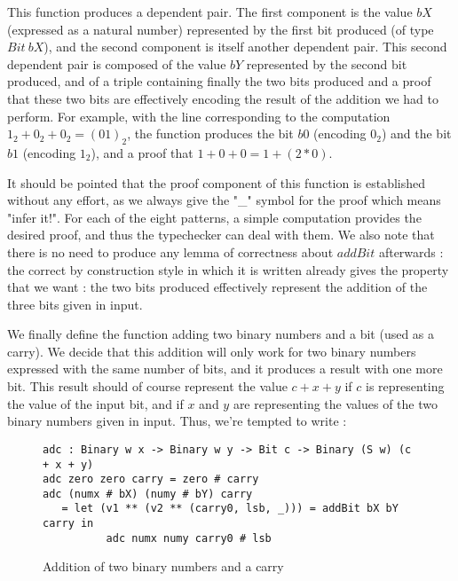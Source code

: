This function produces a dependent pair. The first component is the value $bX$ (expressed as a natural number) represented by the first bit produced (of type $Bit\ bX$), and the second component is itself another dependent pair. This second dependent pair is composed of the value $bY$ represented by the second bit produced, and of a triple containing finally the two bits produced and a proof that these two bits are effectively encoding the result of the addition we had to perform.
For example, with the line corresponding to the computation $1_2 + 0_2 + 0_2 = (01)_2$, the function produces the bit $b0$ (encoding $0_2$) and the bit $b1$ (encoding $1_2$), and a proof that $1 + 0 + 0 = 1 + (2*0)$.

It should be pointed that the proof component of this function is established without any effort, as we always give the "\_" symbol for the proof which means "infer it!". For each of the eight patterns, a simple computation provides the desired proof, and thus the typechecker can deal with them.
We also note that there is no need to produce any lemma of correctness about $addBit$ afterwards : the correct by construction style in which it is written already gives the property that we want : the two bits produced effectively represent the addition of the three bits given in input.

We finally define the function adding two binary numbers and a bit (used as a carry). We decide that this addition will only work for two binary numbers expressed with the same number of bits, and it produces a result with one more bit. This result should of course represent the value $c + x + y$ if $c$ is representing the value of the input bit, and if $x$ and $y$ are representing the values of the two binary numbers given in input. Thus, we're tempted to write :
\begin{figure}[H]
\figrule
\begin{center}
\begin{lstlisting}
adc : Binary w x -> Binary w y -> Bit c -> Binary (S w) (c + x + y)
adc zero zero carry = zero # carry
adc (numx # bX) (numy # bY) carry
   = let (v1 ** (v2 ** (carry0, lsb, _))) = addBit bX bY carry in
          adc numx numy carry0 # lsb
\end{lstlisting}
\end{center}
\caption{Addition of two binary numbers and a carry}
\figrule
\end{figure}

